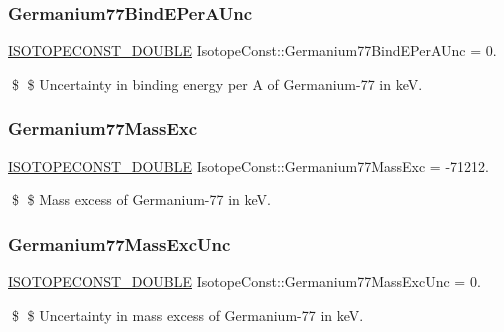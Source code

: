 \subsubsection{\texorpdfstring{Germanium77\+Bind\+E\+Per\+A\+Unc}{Germanium77BindEPerAUnc}}
{\footnotesize\ttfamily \mbox{\hyperlink{group___isotope_const-_macros_ga8f45a7272ce02c0b4c65c44636ed719a}{I\+S\+O\+T\+O\+P\+E\+C\+O\+N\+S\+T\+\_\+\+D\+O\+U\+B\+LE}} Isotope\+Const\+::\+Germanium77\+Bind\+E\+Per\+A\+Unc = 0.}

\$ \$ Uncertainty in binding energy per A of Germanium-\/77 in keV. \mbox{\label{group___isotope_const-_germanium-_ge77_gae54523340b286aa07aac8a8cf4672cd5}} 
\subsubsection{\texorpdfstring{Germanium77\+Mass\+Exc}{Germanium77MassExc}}
{\footnotesize\ttfamily \mbox{\hyperlink{group___isotope_const-_macros_ga8f45a7272ce02c0b4c65c44636ed719a}{I\+S\+O\+T\+O\+P\+E\+C\+O\+N\+S\+T\+\_\+\+D\+O\+U\+B\+LE}} Isotope\+Const\+::\+Germanium77\+Mass\+Exc = -\/71212.}

\$ \$ Mass excess of Germanium-\/77 in keV. \mbox{\label{group___isotope_const-_germanium-_ge77_ga7aa01cc0e8b0d3c50373697de92b87f1}} 
\subsubsection{\texorpdfstring{Germanium77\+Mass\+Exc\+Unc}{Germanium77MassExcUnc}}
{\footnotesize\ttfamily \mbox{\hyperlink{group___isotope_const-_macros_ga8f45a7272ce02c0b4c65c44636ed719a}{I\+S\+O\+T\+O\+P\+E\+C\+O\+N\+S\+T\+\_\+\+D\+O\+U\+B\+LE}} Isotope\+Const\+::\+Germanium77\+Mass\+Exc\+Unc = 0.}

\$ \$ Uncertainty in mass excess of Germanium-\/77 in keV. \mbox{\label{group___isotope_const-_germanium-_ge77_gae5d3ba1d787663f5b577ae950fe40257}} 
